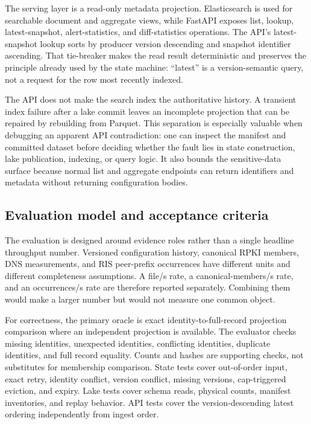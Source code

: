 The serving layer is a read-only metadata projection. Elasticsearch is used for searchable document and aggregate views, while FastAPI exposes list, lookup, latest-snapshot, alert-statistics, and diff-statistics operations. The API's latest-snapshot lookup sorts by producer version descending and snapshot identifier ascending. That tie-breaker makes the read result deterministic and preserves the principle already used by the state machine: ``latest'' is a version-semantic query, not a request for the row most recently indexed.

The API does not make the search index the authoritative history. A transient index failure after a lake commit leaves an incomplete projection that can be repaired by rebuilding from Parquet. This separation is especially valuable when debugging an apparent API contradiction: one can inspect the manifest and committed dataset before deciding whether the fault lies in state construction, lake publication, indexing, or query logic. It also bounds the sensitive-data surface because normal list and aggregate endpoints can return identifiers and metadata without returning configuration bodies.

\subsection{Evaluation model and acceptance criteria}

The evaluation is designed around evidence roles rather than a single headline throughput number. Versioned configuration history, canonical RPKI members, DNS measurements, and RIS peer-prefix occurrences have different units and different completeness assumptions. A file/s rate, a canonical-members/s rate, and an occurrences/s rate are therefore reported separately. Combining them would make a larger number but would not measure one common object.

For correctness, the primary oracle is exact identity-to-full-record projection comparison where an independent projection is available. The evaluator checks missing identities, unexpected identities, conflicting identities, duplicate identities, and full record equality. Counts and hashes are supporting checks, not substitutes for membership comparison. State tests cover out-of-order input, exact retry, identity conflict, version conflict, missing versions, cap-triggered eviction, and expiry. Lake tests cover schema reads, physical counts, manifest inventories, and replay behavior. API tests cover the version-descending latest ordering independently from ingest order.

